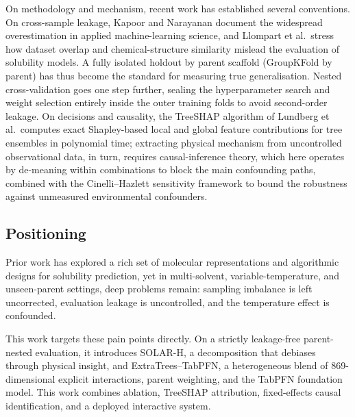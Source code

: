 On methodology and mechanism, recent work has established several conventions. On cross-sample leakage, Kapoor and Narayanan document the widespread overestimation in applied machine-learning science\cite{leakage2023}, and Llompart et al.\ stress how dataset overlap and chemical-structure similarity mislead the evaluation of solubility models\cite{solubility2024}. A fully isolated holdout by parent scaffold (GroupKFold by parent) has thus become the standard for measuring true generalisation. Nested cross-validation goes one step further, sealing the hyperparameter search and weight selection entirely inside the outer training folds to avoid second-order leakage\cite{varma2006,cawley2010}. On decisions and causality, the TreeSHAP algorithm of Lundberg et al.\ computes exact Shapley-based local and global feature contributions for tree ensembles in polynomial time\cite{treeshap2020}; extracting physical mechanism from uncontrolled observational data, in turn, requires causal-inference theory\cite{pearl2009}, which here operates by de-meaning within combinations to block the main confounding paths, combined with the Cinelli--Hazlett sensitivity framework to bound the robustness against unmeasured environmental confounders\cite{sensitivity2020}.

\subsection{Positioning}

Prior work has explored a rich set of molecular representations and algorithmic designs for solubility prediction, yet in multi-solvent, variable-temperature, and unseen-parent settings, deep problems remain: sampling imbalance is left uncorrected, evaluation leakage is uncontrolled, and the temperature effect is confounded.

This work targets these pain points directly. On a strictly leakage-free parent-nested evaluation, it introduces SOLAR-H, a decomposition that debiases through physical insight, and ExtraTrees--TabPFN, a heterogeneous blend of 869-dimensional explicit interactions, parent weighting, and the TabPFN foundation model. This work combines ablation, TreeSHAP attribution, fixed-effects causal identification, and a deployed interactive system.
